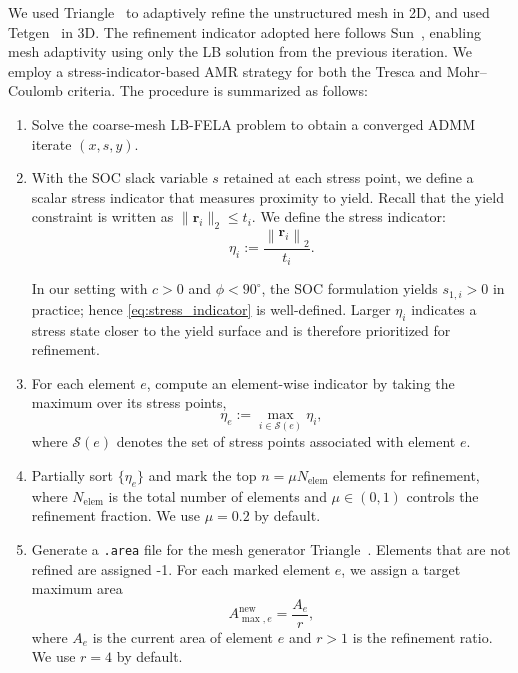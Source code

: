 We used Triangle~\cite{Triangle} to adaptively refine the unstructured mesh in 2D, and used Tetgen~\cite{TetGen} in 3D. The refinement indicator adopted here follows Sun~\cite{LBAdaptive}, enabling mesh adaptivity using only the LB solution from the previous iteration. We employ a stress-indicator-based AMR strategy for both the Tresca and Mohr--Coulomb criteria. The procedure is summarized as follows:

\begin{enumerate}
  \item Solve the coarse-mesh LB-FELA problem to obtain a converged ADMM iterate $(x,s,y)$.

  \item With the SOC slack variable $s$ retained at each stress point, we define a scalar stress indicator that measures proximity to yield. 
Recall that the yield constraint is written as $\| \boldsymbol{r}_i \|_2 \le t_i $. We define the stress indicator:
\begin{equation}
\eta_i := \frac{\left\| \boldsymbol{r}_i \right\|_2}{ t_i } .
\label{eq:stress_indicator}
\end{equation}


In our setting with $c>0$ and $\phi<90^\circ$, the SOC formulation yields $s_{1,i}>0$ in practice; hence \eqref{eq:stress_indicator} is well-defined. Larger $\eta_i$ indicates a stress state closer to the yield surface and is therefore prioritized for refinement.

  \item For each element $e$, compute an element-wise indicator by taking the maximum over its stress points,
  \begin{equation}
    \eta_e := \max_{i\in \mathcal{S}(e)} \eta_i,
  \end{equation}
  where $\mathcal{S}(e)$ denotes the set of stress points associated with element $e$.

  \item Partially sort $\{\eta_e\}$ and mark the top $n=\mu N_{\mathrm{elem}}$ elements for refinement, where $N_{\mathrm{elem}}$ is the total number of elements and $\mu\in(0,1)$ controls the refinement fraction. We use $\mu=0.2$ by default.

  \item Generate a \texttt{.area} file for the mesh generator Triangle~\cite{Triangle}. Elements that are not refined are assigned -1. For each marked element $e$, we assign a target maximum area
  \begin{equation}
    A^{\mathrm{new}}_{\max,e} = \frac{A_e}{r},
  \end{equation}
  where $A_e$ is the current area of element $e$ and $r>1$ is the refinement ratio. We use $r = 4$ by default.
\end{enumerate}




